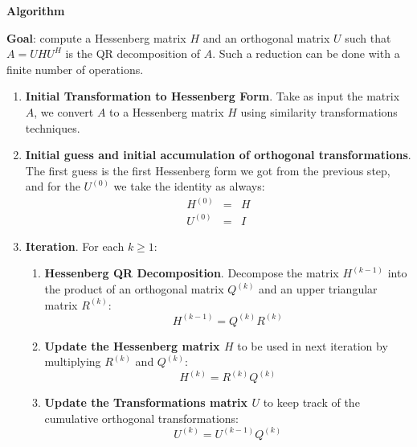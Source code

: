 \highspace
\begin{flushleft}
    \textcolor{Green3}{ \textbf{Algorithm}}
\end{flushleft}
\textbf{Goal}: compute a Hessenberg matrix $H$ and an orthogonal matrix $U$ such that $A = UHU^{H}$ is the QR decomposition of $A$. Such  a reduction can be done with a finite number of operations.
\begin{enumerate}
    \item \textbf{Initial Transformation to Hessenberg Form}. Take as input the matrix $A$, we convert $A$ to a Hessenberg matrix $H$ using similarity transformations techniques.
    
    \item \textbf{Initial guess and initial accumulation of orthogonal transformations}. The first guess is the first Hessenberg form we got from the previous step, and for the $U^{\left(0\right)}$ we take the identity as always:
    \begin{equation*}
        \begin{array}{rcl}
            H^{\left(0\right)} &=& H \\ [.3em]
            U^{\left(0\right)} &=& I
        \end{array}
    \end{equation*}

    \item \textbf{Iteration}. For each $k \ge 1$:
    \begin{enumerate}
        \item \textbf{Hessenberg QR Decomposition}. Decompose the matrix $H^{\left(k-1\right)}$ into the product of an orthogonal matrix $Q^{\left(k\right)}$ and an upper triangular matrix $R^{\left(k\right)}$:
        \begin{equation*}
            H^{\left(k-1\right)} = Q^{\left(k\right)} R^{\left(k\right)}
        \end{equation*}

        \item \textbf{Update the Hessenberg matrix $H$} to be used in next iteration by multiplying $R^{\left(k\right)}$ and $Q^{\left(k\right)}$:
        \begin{equation*}
            H^{\left(k\right)} = R^{\left(k\right)} Q^{\left(k\right)}
        \end{equation*}

        \item \textbf{Update the Transformations matrix $U$} to keep track of the cumulative orthogonal transformations:
        \begin{equation*}
            U^{\left(k\right)} = U^{\left(k-1\right)} Q^{\left(k\right)}
        \end{equation*}
    \end{enumerate}


\end{enumerate}
